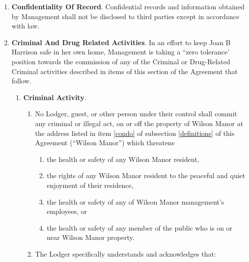 \documentclass[12pt,letterpaper]{article}
\newcommand{\lodger}{Lodger}
\newcommand{\mom}{Joan B Harrison}
\newcommand{\management}{Management}
\newcommand{\condo}{Wilson Manor}
\newcommand{\lemail}{Lodger Email}
\newcommand{\paymenttime}{Payment Notification Time-Date}
\begin{document}
\begin{enumerate}
\begin{enumerate}
\begin{enumerate}
					\item For reasons of security and convenience, \management{} shall not accept cash payments. Unless otherwise directed in writing by \management{}, all payments shall be made through Venmo's website https://venmo.com/, one of Venmo's apps for Android/iOS, or by any other method Venmo provides. 
				\end{enumerate}
			\item \textbf{Receipt}. \management{} will provide receipt of payment via one of the \lemail{} that is set forth in item \ref{lemail} of subsection \ref{definitions} of this Agreement{}, and record payment was received at the \paymenttime{}. 
		\end{enumerate}
	\item \textbf{Confidentiality Of Record}. 
		Confidential records and information obtained by \management{} shall not be disclosed to third parties except in accordance with law. 
	\item \textbf{Criminal And Drug Related Activities}. 
		In an effort to keep \mom{} safe in her own home, \management{} is taking a ``zero tolerance' position towards the commission of any of the Criminal or Drug-Related Criminal activities described in items of this section of the Agreement that follow. 
		\begin{enumerate} 
			\item \textbf{Criminal Activity}. \label{criminal}
				\begin{enumerate}
					\item No \lodger{}, guest, or other person under their control shall commit any criminal or illegal act, on or off the property of \condo{} at the address listed in item \ref{condo} of subsection \ref{definitions} of this Agreement (``\condo{}'') which threatens 
						\begin{enumerate} 
							\item the health or safety of any \condo{} resident, 
							\item the rights of any \condo{} resident to the peaceful and quiet enjoyment of their residence, 
							\item the health or safety of any of \condo{} management's employees, or 
							\item the health or safety of any member of the public who is on or near \condo{} property. 
						\end{enumerate} 
					\item The \lodger{} specifically understands and acknowledges that: 
						\begin{enumerate} 

\end{enumerate}
\end{enumerate}
\end{enumerate}
\end{enumerate}
\end{document}
